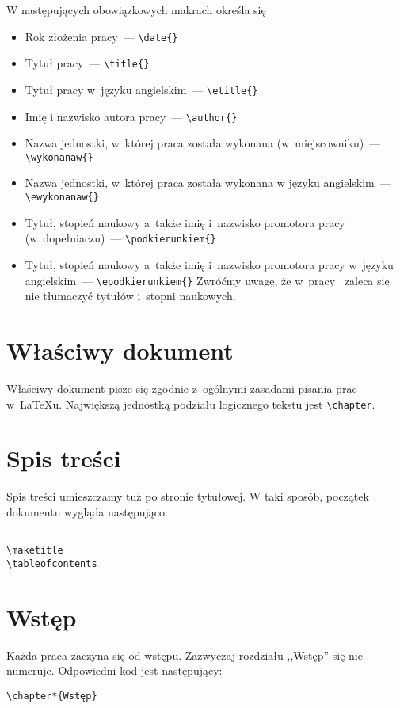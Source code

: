 \smallbreak
W następujących obowiązkowych makrach określa się
\begin{itemize}
 \item Rok złożenia pracy~--- \verb|\date{}|
 \item Tytuł pracy~--- \verb|\title{}|
 \item Tytuł pracy w~języku angielskim~--- \verb|\etitle{}|
 \item Imię i nazwisko autora pracy~--- \verb|\author{}|
 \item Nazwa jednostki, w~której praca została wykonana (w~miejscowniku)~--- \verb|\wykonanaw{}|
 \item Nazwa jednostki, w~której praca została wykonana w języku angielskim~--- \verb|\ewykonanaw{}|
 \item Tytuł, stopień naukowy a~także imię i~nazwisko promotora pracy (w~dopełniaczu)~--- \verb|\podkierunkiem{}|
 \item Tytuł, stopień naukowy a~także imię i~nazwisko promotora pracy w~języku angielskim~--- \verb|\epodkierunkiem{}| Zwróćmy uwagę, że w~pracy~\cite{Maslowski} zaleca się nie tłumaczyć tytułów i~stopni naukowych.
\end{itemize}



\section{Właściwy dokument}
Właściwy dokument pisze się zgodnie z~ogólnymi zasadami pisania prac w~\LaTeX u. Największą jednostką podziału logicznego tekstu jest \verb|\chapter|.

\section{Spis treści}
Spis treści umieszczamy tuż po stronie tytułowej. W taki sposób, początek dokumentu wygląda następująco:
\begin{verbatim}

\maketitle
\tableofcontents
\end{verbatim}


\section{Wstęp}
Każda praca zaczyna się od wstępu. Zazwyczaj rozdziału ,,Wstęp'' się nie numeruje. Odpowiedni kod jest następujący:
\begin{verbatim}
\chapter*{Wstęp}
\end{verbatim}

